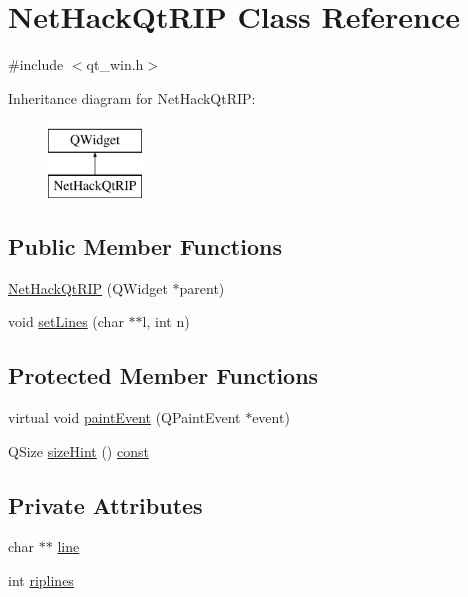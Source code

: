 \hypertarget{classNetHackQtRIP}{\section{Net\+Hack\+Qt\+R\+I\+P Class Reference}
\label{classNetHackQtRIP}
}


{\ttfamily \#include $<$qt\+\_\+win.\+h$>$}

Inheritance diagram for Net\+Hack\+Qt\+R\+I\+P\+:\begin{figure}[H]
\begin{center}
\leavevmode
\includegraphics[height=2.000000cm]{classNetHackQtRIP}
\end{center}
\end{figure}
\subsection*{Public Member Functions}
\begin{DoxyCompactItemize}
\item 
\hyperlink{classNetHackQtRIP_a8075a2831c706e140904eba285f377a4}{Net\+Hack\+Qt\+R\+I\+P} (Q\+Widget $\ast$parent)
\item 
void \hyperlink{classNetHackQtRIP_ae720807888687dd023b18ff4628c9f0d}{set\+Lines} (char $\ast$$\ast$l, int n)
\end{DoxyCompactItemize}
\subsection*{Protected Member Functions}
\begin{DoxyCompactItemize}
\item 
virtual void \hyperlink{classNetHackQtRIP_a83b829191a03aac793afa91105a552f9}{paint\+Event} (Q\+Paint\+Event $\ast$event)
\item 
Q\+Size \hyperlink{classNetHackQtRIP_a649d53cd2c00b0cff6e5bad94b82645e}{size\+Hint} () \hyperlink{tradstdc_8h_a2c212835823e3c54a8ab6d95c652660e}{const} 
\end{DoxyCompactItemize}
\subsection*{Private Attributes}
\begin{DoxyCompactItemize}
\item 
char $\ast$$\ast$ \hyperlink{classNetHackQtRIP_a63a0d243b2ea964157cb64db7134af85}{line}
\item 
int \hyperlink{classNetHackQtRIP_a5f98b6ff5ecea13f3e9291e08c1817d9}{riplines}
\end{DoxyCompactItemize}

